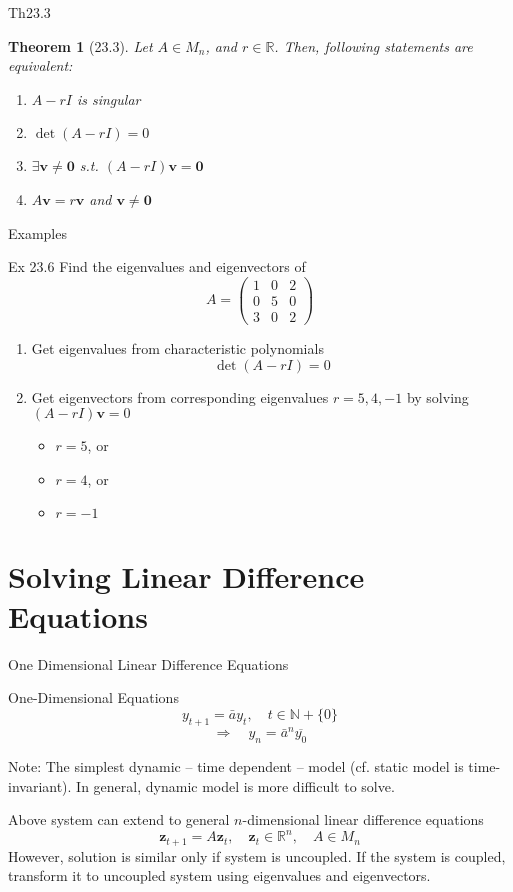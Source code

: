 \documentclass[final]{beamer}
\newtheorem{thm}{Theorem}
\newcommand{\bb}{\mathbb}
\newcommand{\bd}{\mathbf}
\begin{document}
\begin{frame}[t]{Th23.3}
	\begin{thm}
		[23.3] Let $A\in M_n$, and $r\in\bb{R}$. Then, following statements are equivalent:
		\begin{enumerate}
			\item $A-rI$ is singular
			\item $\det(A-rI)=0$
			\item $\exists \bd{v}\neq\bd{0}$ s.t. $(A-rI)\bd{v}=\bd{0}$
			\item $A\bd{v}=r\bd{v}$ and $\bd{v}\neq \bd{0}$
		\end{enumerate}
	\end{thm}
\end{frame}

\begin{frame}[t]{Examples}
	\begin{block}
		{Ex 23.6} Find the eigenvalues and eigenvectors of \[
			A = \begin{pmatrix}
				1&0&2\\
				0&5&0\\
				3&0&2
			\end{pmatrix}
		\]
		\begin{enumerate}[Step 1)]
			\item Get eigenvalues from characteristic polynomials
			\[
				\det (A-rI) = 0
			\]
			\item Get eigenvectors from corresponding eigenvalues $r=5,4,-1$ by solving $(A-rI)\bd{v}=0$
			\begin{itemize}
				\item $r=5$, or
				\item $r=4$, or
				\item $r=-1$
			\end{itemize}
		\end{enumerate}
	\end{block}
\end{frame}

\section{Solving Linear Difference Equations} %
\label{sec:solving_linear_difference_equations}
\begin{frame}[t]{One Dimensional Linear Difference Equations}
	\begin{block}
		{One-Dimensional Equations}
		\[
			y_{t+1} = \bar{a}y_t, \quad t\in \bb{N}+\{0\}
		\]
		\[
			\Rightarrow\quad y_n = \bar{a}^n \overline{y_0}
		\]
	\end{block}
	Note: The simplest dynamic -- time dependent -- model (cf. static model is time-invariant). In general, dynamic model is more difficult to solve.
	
	Above system can extend to general $n$-dimensional linear difference equations\[
		\bd{z}_{t+1}=A\bd{z}_t, \quad \bd{z}_t\in \bb{R}^n,\quad A\in M_n
	\]
	However, solution is similar only if system is uncoupled. If the system is coupled, transform it to uncoupled system using eigenvalues and eigenvectors. 
\end{frame}
\end{document}
